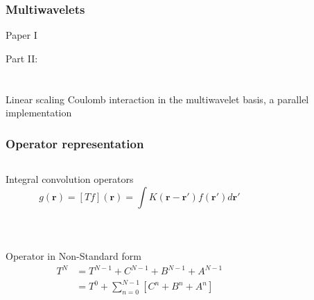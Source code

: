 \documentclass[mathserif, 10pt]{beamer}
\begin{document}
\begin{frame}
    \frametitle{Multiwavelets}
    Paper I
\end{frame}

\begin{frame}
    \centering
    \Large{Part II:}\\
    \ \\
    \ \\
    \centering
    \Large{Linear scaling Coulomb interaction in the multiwavelet basis,
	a parallel implementation}
\end{frame}


\begin{frame}
    \frametitle{Operator representation}
    \begin{columns}
    \begin{column}[b]{0.5\linewidth}
    \centering
    Integral convolution operators
    \begin{equation}
	\nonumber
	g(\boldsymbol{r}) = \left[T f\right](\boldsymbol{r}) = \int K(\boldsymbol{r} - \boldsymbol{r'}) 
	    f(\boldsymbol{r'}) d\boldsymbol{r'}
    \end{equation}
    \ \\
    \ \\
    \ \\
    \pause
    Operator in Non-Standard form
    \begin{align}
	\nonumber
	T^N &= T^{N-1} + C^{N-1} + B^{N-1} + A^{N-1}\\
	\nonumber
	    &= T^0 + \sum_{n=0}^{N-1} \left[C^n + B^n + A^n\right]
    \end{align}
    \end{column}
    \begin{column}[b]{0.5\linewidth}
    \begin{center}

\end{center}
\end{column}
\end{columns}
\end{frame}
\end{document}
